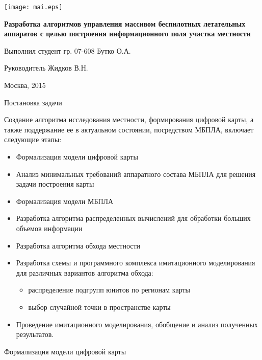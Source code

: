 



\begin{cslide}
    \texttt{[image: mai.eps]}

    \large\textbf{ Разработка алгоритмов управления
    массивом беспилотных летательных аппаратов
    с целью построения информационного поля
    участка местности}

    \vfill

    \begin{flushright}
    \small Выполнил студент гр. 07-608 Бутко О.А.

    \small Руководитель Жидков В.Н.
    \end{flushright}

    \vfill

    \small Москва, 2015
\end{cslide}

\begin{tslide}{Постановка задачи}

Создание алгоритма исследования местности,
формирования цифровой карты, а также поддержание
ее в актуальном состоянии, посредством МБПЛА,
включает следующие этапы:
\begin{itemize}
\item Формализация модели цифровой карты
\item Анализ минимальных требований аппаратного состава МБПЛА для решения задачи построения карты
\item Формализация модели МБПЛА
\item Разработка алгоритма распределенных вычислений для обработки больших объемов информации
\item Разработка алгоритма обхода местности
\item Разработка схемы и программного комплекса имитационного моделирования для различных вариантов алгоритма обхода:
    \begin{itemize}
    \item распределение подгрупп юнитов по регионам карты
    \item выбор случайной точки в пространстве карты
    \end{itemize}
\item Проведение имитационного моделирования, обобщение и анализ полученных результатов.
\end{itemize}

\end{tslide}

\begin{tslide}{Формализация модели цифровой карты}
\end{tslide}

